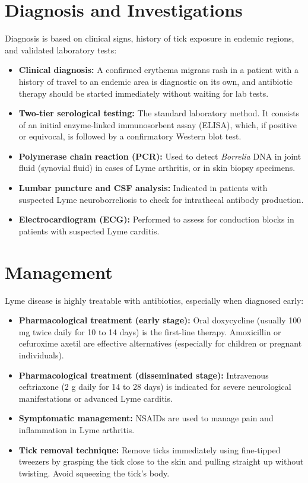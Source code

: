 \section*{Diagnosis and Investigations}
Diagnosis is based on clinical signs, history of tick exposure in endemic regions, and validated laboratory tests:
\begin{itemize}
    \item \textbf{Clinical diagnosis:} A confirmed erythema migrans rash in a patient with a history of travel to an endemic area is diagnostic on its own, and antibiotic therapy should be started immediately without waiting for lab tests.
    \item \textbf{Two-tier serological testing:} The standard laboratory method. It consists of an initial enzyme-linked immunosorbent assay (ELISA), which, if positive or equivocal, is followed by a confirmatory Western blot test.
    \item \textbf{Polymerase chain reaction (PCR):} Used to detect \textit{Borrelia} DNA in joint fluid (synovial fluid) in cases of Lyme arthritis, or in skin biopsy specimens.
    \item \textbf{Lumbar puncture and CSF analysis:} Indicated in patients with suspected Lyme neuroborreliosis to check for intrathecal antibody production.
    \item \textbf{Electrocardiogram (ECG):} Performed to assess for conduction blocks in patients with suspected Lyme carditis.
\end{itemize}

\section*{Management}
Lyme disease is highly treatable with antibiotics, especially when diagnosed early:
\begin{itemize}
    \item \textbf{Pharmacological treatment (early stage):} Oral doxycycline (usually 100 mg twice daily for 10 to 14 days) is the first-line therapy. Amoxicillin or cefuroxime axetil are effective alternatives (especially for children or pregnant individuals).
    \item \textbf{Pharmacological treatment (disseminated stage):} Intravenous ceftriaxone (2 g daily for 14 to 28 days) is indicated for severe neurological manifestations or advanced Lyme carditis.
    \item \textbf{Symptomatic management:} NSAIDs are used to manage pain and inflammation in Lyme arthritis.
    \item \textbf{Tick removal technique:} Remove ticks immediately using fine-tipped tweezers by grasping the tick close to the skin and pulling straight up without twisting. Avoid squeezing the tick's body.
\end{itemize}

